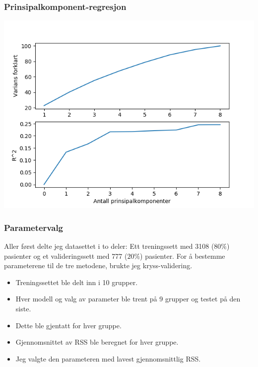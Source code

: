 \documentclass[aspectratio=169]{beamer}
\begin{document}
\begin{frame}
  \frametitle{Prinsipalkomponent-regresjon}
  \begin{center}
    \includegraphics[height=0.8\textheight]{pcr.png}
  \end{center}
\end{frame}

\begin{frame}
  \frametitle{Parametervalg}
  Aller først delte jeg datasettet i to deler: Ett treningssett med 3108 (\(80\%\)) pasienter og et valideringssett med 777 (\(20\%\)) pasienter.
  \pause
  For å bestemme parameterene til de tre metodene, brukte jeg kryss-validering.
  \pause
  \begin{itemize}
    \pause
    \item Treningssettet ble delt inn i 10 grupper.
    \pause
    \item Hver modell og valg av parameter ble trent på 9 grupper og testet på den siste.
    \pause
    \item Dette ble gjentatt for hver gruppe.
    \pause
    \item Gjennomsnittet av RSS ble beregnet for hver gruppe.
    \pause
    \item Jeg valgte den parameteren med lavest gjennomsnittlig RSS.
  \end{itemize}
\end{frame}
\end{document}
